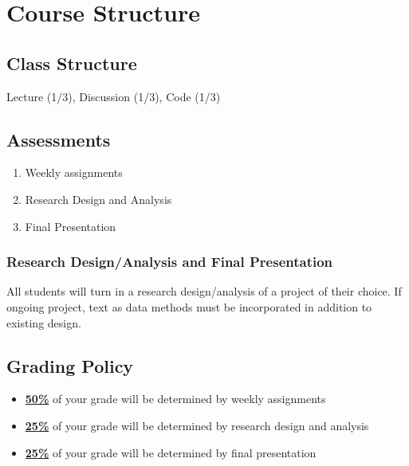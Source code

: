 \documentclass[11pt]{article}
\begin{document}

\section*{Course Structure}

\subsection*{Class Structure}

Lecture (1/3), Discussion (1/3), Code (1/3)


\subsection*{Assessments}

\begin{enumerate}
\item Weekly assignments
\item Research Design and Analysis
\item Final Presentation
\end{enumerate}

\subsubsection*{Research Design/Analysis and Final Presentation}

All students will turn in a research design/analysis of a project of their choice. If ongoing project, text as data methods must be incorporated in addition to existing design.

\subsection*{Grading Policy}

\begin{itemize}
	\item \underline{\textbf{50\%}} of your grade will be determined by weekly assignments
	\item \underline{\textbf{25\%}} of your grade will be determined by research design and analysis
	\item \underline{\textbf{25\%}} of your grade will be determined by final presentation
\end{itemize}


\newpage
\end{document}
